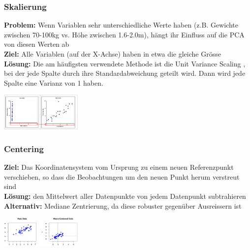 \documentclass{article}
\newenvironment{Figure}
	{\par\medskip\noindent\minipage{\linewidth}}
	{\endminipage\par\medskip}
\theoremstyle{merke}
\theoremstyle{definition}
\begin{document}
		\subsubsection{Skalierung}
        \textbf{Problem:} Wenn Variablen sehr unterschiedliche Werte haben (z.B. Gewichte zwischen 70-100kg vs. Höhe zwischen 1.6-2.0m), hängt ihr Einfluss auf die PCA von diesen Werten ab\\
        \textbf{Ziel:} Alle Variablen (auf der X-Achse) haben in etwa die gleiche Grösse\\
        \textbf{Lösung:} Die am häufigsten verwendete Methode ist die Unit Variance Scaling , bei der jede Spalte durch ihre Standardabweichung geteilt wird. Dann wird jede Spalte eine Varianz von 1 haben.
        \begin{Figure}
        \centering
        \includegraphics[width=150px]{img/Scaling.png}
            \label{fig:Unterschied nach der Skalierung}
        \end{Figure}

		\subsubsection{Centering}
        \textbf{Ziel:} Das Koordinatensystem vom Ursprung zu einem neuen Referenzpunkt verschieben, so dass die Beobachtungen um den neuen Punkt herum verstreut sind\\
        \textbf{Lösung:} den Mittelwert aller Datenpunkte von jedem Datenpunkt subtrahieren\\
        \textbf{Alternativ:} Mediane Zentrierung, da diese robuster gegenüber Ausreissern ist
        \begin{Figure}
        \centering
        \includegraphics[width=150px]{img/Centering.png}
            \label{fig:Unterschied der beiden Möglichkeiten nach der Zentrierung}
        \end{Figure}
\end{document}
